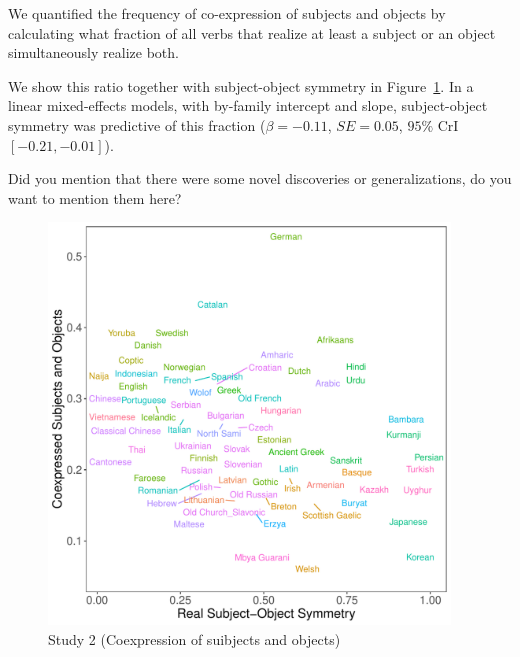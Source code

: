 \documentclass[11pt,a4paper]{article}
\newcommand\mhahn[1]{{\color{red}(#1)}}
\begin{document}
We quantified the frequency of co-expression of subjects and objects by calculating what fraction of all verbs that realize at least a subject or an object simultaneously realize both.

We show this ratio together with subject-object symmetry in Figure~\ref{fig:study2}.
In a linear mixed-effects models, with by-family intercept and slope, subject-object symmetry was predictive of this fraction ($\beta=-0.11$, $SE=0.05$, $95\%$ CrI $[-0.21, -0.01]$).


{\color{blue}Did you mention that there were some novel discoveries or generalizations, do you want to mention them here?}

\begin{figure}
    \centering
    \includegraphics[width=0.95\textwidth]{figures/objects-order-pureud-byVerb_FORMAT.pdf}
    \caption{Study 2 (Coexpression of suibjects and objects)}
    \label{fig:study2}
\end{figure}



\end{document}
